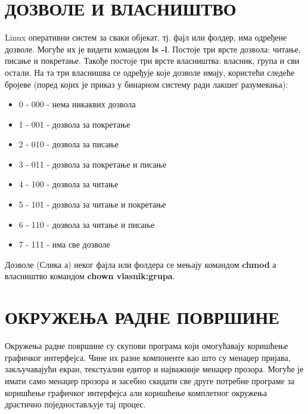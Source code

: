 \documentclass[a4paper,14pt]{article}
\begin{document}
\section{ДОЗВОЛЕ И ВЛАСНИШТВО}
Linux оперативни систем за сваки објекат, тј. фајл или фолдер, има одређене дозволе. Могуће их је видети командом \textbf{ls -l}. Постоје три врсте дозвола: читање, писање и покретање. Такође постоје три врсте власништва: власник, група и сви остали. На та три власнишва се одређује које дозволе имају, користећи следеће бројеве (поред којих је приказ у бинарном систему ради лакшег разумевања):
\begin{itemize}
\item 0 - 000 - нема никаквих дозвола
\item 1 - 001 - дозвола за покретање
\item 2 - 010 - дозвола за писање
\item 3 - 011 - дозвола за покретање и писање
\item 4 - 100 - дозвола за читање
\item 5 - 101 - дозвола за читање и покретање
\item 6 - 110 - дозвола за читање и писање
\item 7 - 111 - има све дозволе
\end{itemize}
Дозволе (Слика а) неког фајла или фолдера се мењају командом \textbf{chmod} а власништво командом \textbf{chown vlasnik:grupa}.
\begin{figure}[h]
	\centering
\end{figure}
\newpage

\section{ОКРУЖЕЊА РАДНЕ ПОВРШИНЕ}
Окружења радне површине су скупови програма који омогућавају коришћење графичког интерфејса. Чине их разне компоненте као што су менаџер пријава, закључавајући екран, текстуални едитор и најважније менаџер прозора. Могуће је имати само менаџер прозора и засебно скидати све друге потребне програме за коришћење графичког интерфејса али коришћење комплетног окружења драстично поједностављује тај процес.
\end{document}
